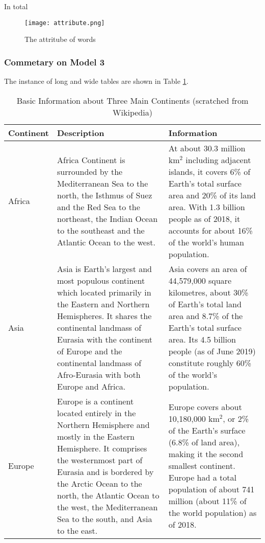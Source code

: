 \documentclass[12pt]{article}  %
\begin{document}
\clearpage

In total 










\begin{figure}[htbp]
    \texttt{[image: attribute.png]}
	\caption{ The attritube of words}\label{fig:result}
\end{figure}


\clearpage
\subsubsection{Commetary on Model 3}
The instance of long and wide tables are shown in Table \ref{tb:longtable}.

\begin{longtable}{ p{4em} p{14em} p{14em} }
\caption{Basic Information about Three Main Continents (scratched from Wikipedia)}
\label{tb:longtable}\\
\toprule
Continent & Description & Information \\
\midrule
Africa & Africa Continent is surrounded by the Mediterranean Sea to the
north, the Isthmus of Suez and the Red Sea to the northeast, the Indian
Ocean to the southeast and the Atlantic Ocean to the west. &
At about 30.3 million km$^2$ including adjacent islands, it covers 6\%
of Earth's total surface area and 20\% of its land area. With 1.3
billion people as of 2018, it accounts for about 16\% of the world's
human population. \\
\midrule
Asia & Asia is Earth's largest and most populous continent which
located primarily in the Eastern and Northern Hemispheres.
It shares the continental landmass of Eurasia with the continent
of Europe and the continental landmass of Afro-Eurasia with both
Europe and Africa. &
Asia covers an area of 44,579,000 square kilometres, about 30\%
of Earth's total land area and 8.7\% of the Earth's total surface
area. Its 4.5 billion people (as of June 2019) constitute roughly
60\% of the world's population. \\
\midrule
Europe & Europe is a continent located entirely in the Northern
Hemisphere and mostly in the Eastern Hemisphere. It comprises the
westernmost part of Eurasia and is bordered by the Arctic Ocean to
the north, the Atlantic Ocean to the west, the Mediterranean Sea to
the south, and Asia to the east. &
Europe covers about 10,180,000 km$^2$, or 2\% of the Earth's surface
(6.8\% of land area), making it the second smallest
continent. Europe had a total population of about 741 million (about
11\% of the world population) as of 2018. \\
\bottomrule

\end{longtable}
\end{document}
